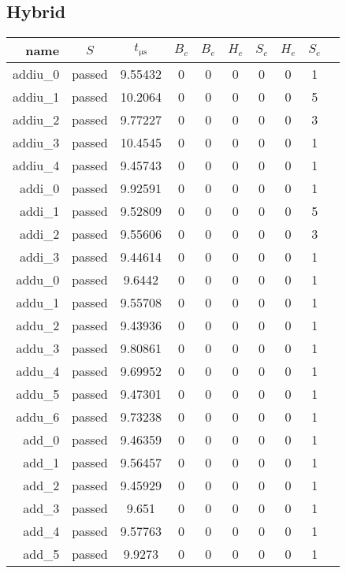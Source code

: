 \subsection{Hybrid}
\begin{longtable}{r|ccccccccc}
    \toprule
    name & $S$ & $t_{\si{\micro\second}}$ & $B_c$ & $B_e$ & $H_c$ & $S_c$ & $H_e$ & $S_e$ \\
    \midrule
    \endhead

    addiu\_0 & passed & 9.55432 & 0 & 0 & 0 & 0 & 0 & 1 \\
    addiu\_1 & passed & 10.2064 & 0 & 0 & 0 & 0 & 0 & 5 \\
    addiu\_2 & passed & 9.77227 & 0 & 0 & 0 & 0 & 0 & 3 \\
    addiu\_3 & passed & 10.4545 & 0 & 0 & 0 & 0 & 0 & 1 \\
    addiu\_4 & passed & 9.45743 & 0 & 0 & 0 & 0 & 0 & 1 \\
    addi\_0 & passed & 9.92591 & 0 & 0 & 0 & 0 & 0 & 1 \\
    addi\_1 & passed & 9.52809 & 0 & 0 & 0 & 0 & 0 & 5 \\
    addi\_2 & passed & 9.55606 & 0 & 0 & 0 & 0 & 0 & 3 \\
    addi\_3 & passed & 9.44614 & 0 & 0 & 0 & 0 & 0 & 1 \\
    addu\_0 & passed & 9.6442 & 0 & 0 & 0 & 0 & 0 & 1 \\
    addu\_1 & passed & 9.55708 & 0 & 0 & 0 & 0 & 0 & 1 \\
    addu\_2 & passed & 9.43936 & 0 & 0 & 0 & 0 & 0 & 1 \\
    addu\_3 & passed & 9.80861 & 0 & 0 & 0 & 0 & 0 & 1 \\
    addu\_4 & passed & 9.69952 & 0 & 0 & 0 & 0 & 0 & 1 \\
    addu\_5 & passed & 9.47301 & 0 & 0 & 0 & 0 & 0 & 1 \\
    addu\_6 & passed & 9.73238 & 0 & 0 & 0 & 0 & 0 & 1 \\
    add\_0 & passed & 9.46359 & 0 & 0 & 0 & 0 & 0 & 1 \\
    add\_1 & passed & 9.56457 & 0 & 0 & 0 & 0 & 0 & 1 \\
    add\_2 & passed & 9.45929 & 0 & 0 & 0 & 0 & 0 & 1 \\
    add\_3 & passed & 9.651 & 0 & 0 & 0 & 0 & 0 & 1 \\
    add\_4 & passed & 9.57763 & 0 & 0 & 0 & 0 & 0 & 1 \\
    add\_5 & passed & 9.9273 & 0 & 0 & 0 & 0 & 0 & 1 \\

\end{longtable}
